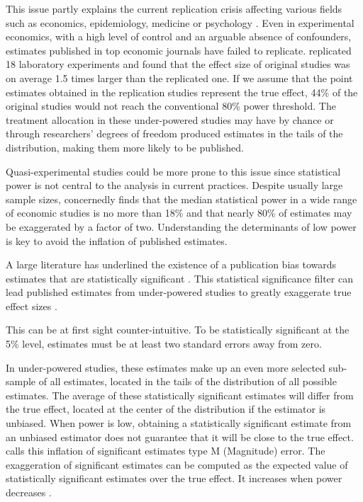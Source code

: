 \documentclass[12pt]{article}
\begin{document}
This issue partly explains the current replication crisis affecting various fields such as economics, epidemiology, medicine or psychology \citep{button_power_2013, open_science_collaboration_estimating_2015, camerer_evaluating_2016, chang_is_2022}. Even in experimental economics, with a high level of control and an arguable absence of confounders, estimates published in top economic journals have failed to replicate. \cite{camerer_evaluating_2016} replicated 18 laboratory experiments and found that the effect size of original studies was on average 1.5 times larger than the replicated one. If we assume that the point estimates obtained in the replication studies represent the true effect, 44\% of the original studies would not reach the conventional 80\% power threshold. The treatment allocation in these under-powered studies may have by chance or through researchers' degrees of freedom produced estimates in the tails of the distribution, making them more likely to be published. 

Quasi-experimental studies could be more prone to this issue since statistical power is not central to the analysis in current practices. Despite usually large sample sizes, \cite{ioannidis_power_2017} concernedly finds that the median statistical power in a wide range of economic studies is no more than 18\% and that nearly 80\% of estimates may be exaggerated by a factor of two. Understanding the determinants of low power is key to avoid the inflation of published estimates. 




A large literature has underlined the existence of a publication bias towards estimates that are statistically significant \citep[for instance]{rosenthal_file_1979, andrews_identification_2019, abadie_statistical_2020, brodeur_methods_2020}. This statistical significance filter can lead published estimates from under-powered studies to greatly exaggerate true effect sizes \citep{ioannidis_why_2008, gelman_beyond_2014}. 

This can be at first sight counter-intuitive. To be statistically significant at the 5\% level, estimates must be at least two standard errors away from zero. 

In under-powered studies, these estimates make up an even more selected sub-sample of all estimates, located in the tails of the distribution of all possible estimates. The average of these statistically significant estimates will differ from the true effect, located at the center of the distribution if the estimator is unbiased. When power is low, obtaining a statistically significant estimate from an unbiased estimator does not guarantee that it will be close to the true effect. \cite{gelman_beyond_2014} calls this inflation of significant estimates type M (Magnitude) error. The exaggeration of significant estimates can be computed as the expected value of statistically significant estimates over the true effect. It increases when power decreases \citep{lu_note_2019, zwet_significance_2021}.
    
\end{document}
